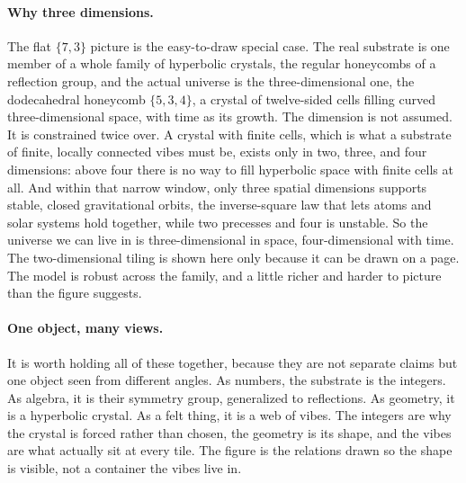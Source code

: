 \paragraph{Why three dimensions.}
The flat $\{7,3\}$ picture is the easy-to-draw special case. The real substrate is one member
of a whole family of hyperbolic crystals, the regular honeycombs of a reflection group, and
the actual universe is the three-dimensional one, the dodecahedral honeycomb $\{5,3,4\}$, a
crystal of twelve-sided cells filling curved three-dimensional space, with time as its growth.
The dimension is not assumed. It is constrained twice over. A crystal with finite cells, which
is what a substrate of finite, locally connected vibes must be, exists only in two, three, and
four dimensions: above four there is no way to fill hyperbolic space with finite cells at all.
And within that narrow window, only three spatial dimensions supports stable, closed
gravitational orbits, the inverse-square law that lets atoms and solar systems hold together,
while two precesses and four is unstable. So the universe we can live in is three-dimensional
in space, four-dimensional with time. The two-dimensional tiling is shown here only because it
can be drawn on a page. The model is robust across the family, and a little richer and harder
to picture than the figure suggests.

\paragraph{One object, many views.}
It is worth holding all of these together, because they are not separate claims but one object
seen from different angles. As numbers, the substrate is the integers. As algebra, it is their
symmetry group, generalized to reflections. As geometry, it is a hyperbolic crystal. As a
felt thing, it is a web of vibes. The integers are why the crystal is forced rather than
chosen, the geometry is its shape, and the vibes are what actually sit at every tile. The
figure is the relations drawn so the shape is visible, not a container the vibes live in.
